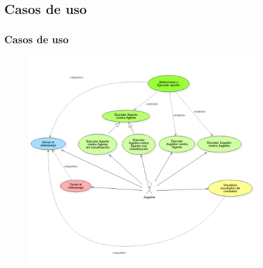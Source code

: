 \documentclass{beamer}
\begin{document}
\subsection{Casos de uso}
\begin{frame}
\frametitle{Casos de uso}
\begin{figure}[h]
	\vspace*{-0.8cm}
	\centerline{\includegraphics[width=10cm]{../diagramas/casosDeUsoCropped.png}}
	\label{casos_de_uso}
\end{figure}

\note{

}
\end{frame}
\end{document}
